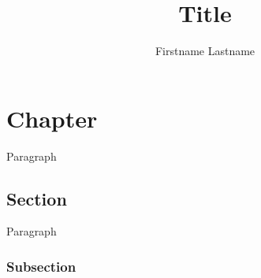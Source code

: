 \documentclass{uecetex2}
\title{Title}
\author{Firstname Lastname}
\begin{document}
	
	\chapter{Chapter}	
	
	Paragraph

	\section{Section}	
	
	Paragraph

	\subsection{Subsection}
	
\end{document}
